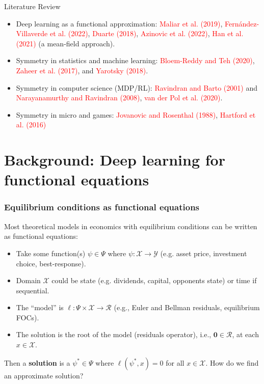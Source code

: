 \documentclass[aspectratio=169,10pt]{beamer}
\newcommand{\emphcolor}[1]{\textbf{\textcolor{emphcolorval}{#1}}}
\newcommand{\Xdom}{\mathcal{X}}
\newcommand{\Yrange}{\mathcal{Y}}
\newcommand{\Resid}{\mathcal{R}}
\begin{document}
	

\begin{frame}{Literature Review}
	\begin{itemize}
	\item Deep learning as a functional approximation: \textcolor{red}{Maliar et al. (2019)}, \textcolor{red}{Fern\'{a}ndez-Villaverde et al. (2022)}, \textcolor{red}{Duarte (2018)}, \textcolor{red}{Azinovic et al. (2022)}, \textcolor{red}{Han et al. (2021)} (a mean-field approach). \vspace{0.1in}
	\item Symmetry in statistics and machine learning:  \textcolor{red}{Bloem-Reddy and Teh (2020)}, \textcolor{red}{Zaheer et al. (2017)}, and \textcolor{red}{Yarotsky (2018)}.\vspace{0.1in}
	\item Symmetry in computer science (MDP/RL):  \textcolor{red}{Ravindran and Barto (2001)} and \textcolor{red}{Narayanamurthy
	and Ravindran (2008)},  \textcolor{red}{van der Pol et al. (2020)}.\vspace{0.1in}
	\item Symmetry in micro and games: \textcolor{red}{Jovanovic and Rosenthal (1988)},  \textcolor{red}{Hartford et al. (2016)}


	\end{itemize}
\end{frame}

\section{\textcolor{PennBlue}{Background: Deep learning for functional equations}}

\begin{frame}
	\frametitle{Equilibrium conditions as functional equations}
	Most theoretical models in economics with equilibrium conditions can be written as functional equations:
	\begin{itemize}
		\item Take some function(s) $\psi \in \varPsi$ where $\psi : \Xdom\to \Yrange$ (e.g. asset price, investment choice, best-response).\vspace{0.1in}
		\item Domain $\Xdom$ could be state (e.g. dividends, capital, opponents state) or time if sequential.\vspace{0.1in}
		\item The ``model'' is $\ell: \varPsi \times \Xdom \rightarrow \Resid$ (e.g., Euler and Bellman residuals, equilibrium FOCs).\vspace{0.1in}
		\item The solution is the root of the model (residuals operator), i.e., $\mathbf{0} \in \Resid$, at each $x \in \Xdom$.\vspace{0.1in}
	\end{itemize}
	Then a \emphcolor{solution} is a $\psi^*\in \varPsi$ where $\ell(\psi^*,x) = 0$ for all $x \in \Xdom$.  How do we find an approximate solution?\vspace{0.1in}
\end{frame}
\end{document}
